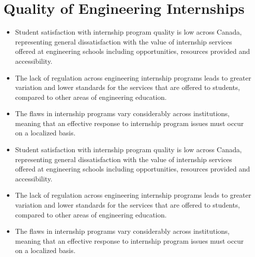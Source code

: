 \section{Quality of Engineering Internships}\label{quality-of-engineering-internships}



\begin{itemize}
 \item Student satisfaction with internship program quality is low across Canada, representing general dissatisfaction with the value of internship services offered at engineering schools including opportunities, resources provided and accessibility.
 \item The lack of regulation across engineering internship programs leads to greater variation and lower standards for the services that are offered to students, compared to other areas of engineering education.
 \item The flaws in internship programs vary considerably across institutions, meaning that an effective response to internship program issues must occur on a localized basis.
\end{itemize}

\begin{itemize}
 \item Student satisfaction with internship program quality is low across Canada, representing general dissatisfaction with the value of internship services offered at engineering schools including opportunities, resources provided and accessibility.
 \item The lack of regulation across engineering internship programs leads to greater variation and lower standards for the services that are offered to students, compared to other areas of engineering education.
 \item The flaws in internship programs vary considerably across institutions, meaning that an effective response to internship program issues must occur on a localized basis.
\end{itemize}

